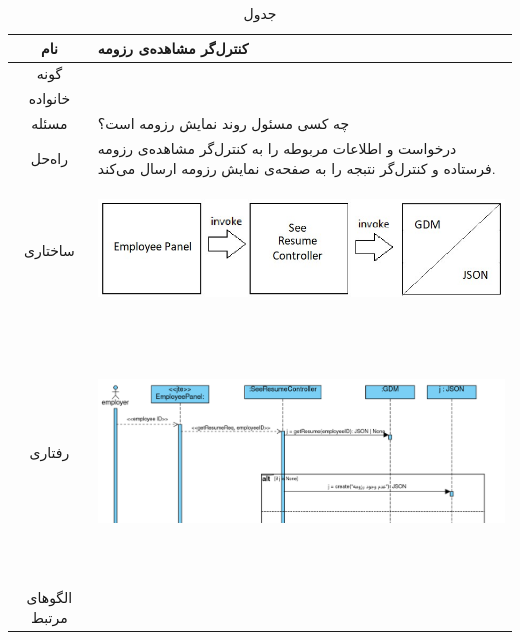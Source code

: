 \begin{table}[H]
	\begin{adjustbox}{width=\textwidth}
		\begin{tabular}{|c|p{\textwidth}|}
			\hline
			نام &
			کنترل‌گر مشاهده‌ی رزومه \\ 
			\hline
			گونه & 
			\grasp \\
			\hline
			خانواده &
			\controller \\
			\hline
			مسئله & 
			چه کسی مسئول روند نمایش رزومه است؟\\
			\hline
			راه‌حل& 
			درخواست و اطلاعات مربوطه را به کنترل‌گر مشاهده‌ی رزومه فرستاده و کنترل‌گر نتبجه را به صفحه‌ی نمایش رزومه ارسال می‌کند. \\
			\hline
			ساختاری & 
			\begin{minipage}{\textwidth}
				\begin{flushleft}
					\begin{minipage}{\textwidth}
						\includegraphics[width=13cm, height=2.7cm]{./images/7-3-1}
					\end{minipage}
				\end{flushleft}
			\end{minipage}
		
			\\
			\hline
			رفتاری & 
			\begin{minipage}{\textwidth}
				\begin{flushleft}
					\begin{minipage}{\textwidth}
						\includegraphics[width=13.5cm, height=6cm]{./images/7-3-2}
					\end{minipage}
				\end{flushleft}
			\end{minipage}
			\\
			\hline
			الگو‌های مرتبط& \\
			\hline
		\end{tabular}
	\end{adjustbox}
	\caption{جدول }
	\label{table-with-pic:3}
\end{table}

